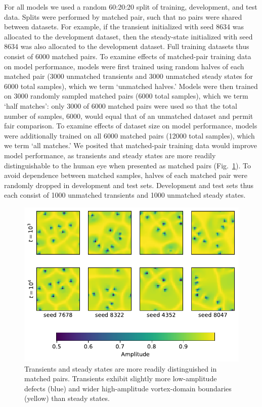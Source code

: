 \documentclass[nofootinbib,pre,superscriptaddress,twocolumn,longbibliography,floatfix]{revtex4-2}
\begin{document}
For all models we used a random 60:20:20 split of training, development, and test data.
Splits were performed by matched pair, such that no pairs were shared between datasets.
For example, if the transient initialized with seed 8634 was allocated to the development dataset,
then the steady-state initialized with seed 8634 was also allocated to the development dataset.
Full training datasets thus consist of 6000 matched pairs.
To examine effects of matched-pair training data on model performance,
models were first trained using random halves of each matched pair (3000 unmatched transients and 3000 unmatched steady states for 6000 total samples),
which we term `unmatched halves.'
Models were then trained on 3000 randomly sampled matched pairs (6000 total samples), which we term `half matches':
only 3000 of 6000 matched pairs were used so that the total number of samples, 6000, would equal that of an unmatched dataset and permit fair comparison.
To examine effects of dataset size on model performance,
models were additionally trained on all 6000 matched pairs (12000 total samples), which we term `all matches.'
We posited that matched-pair training data would improve model performance,
as transients and steady states are more readily distinguishable to the human eye when presented as matched pairs (Fig.~\ref{fig:matched_pairs}).
To avoid dependence between matched samples,
halves of each matched pair were randomly dropped in development and test sets.
Development and test sets thus each consist of 1000 unmatched transients and 1000 unmatched steady states.

\begin{figure}
    \centering
    \includegraphics[width=0.9\linewidth]{../figures/matched_pairs.pdf}
    \caption{Transients and steady states are more readily distinguished in matched pairs.
    Transients exhibit slightly more low-amplitude defects (blue) and
    wider high-amplitude vortex-domain boundaries (yellow) than steady states.
    \label{fig:matched_pairs}
    }
\end{figure}
\end{document}
